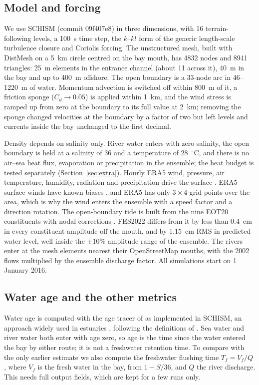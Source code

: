 \documentclass[a4paper,fleqn]{ems-dc}
\begin{document}
\subsection{Model and forcing}
We use SCHISM \citep{Zhang2008,Zhang2016} (commit 09f407e8) in three dimensions, with 16
terrain-following levels, a 100~s time step, the $k$--$kl$ form of the generic length-scale
turbulence closure \citep{Umlauf2003,Warner2005} and Coriolis forcing. The unstructured mesh, built with
DistMesh \citep{Persson2004} on a 5~km circle centred on the bay mouth, has 4832 nodes and
8941 triangles: 25~m elements in the entrance channel (about 11 across it), 40~m in the bay
and up to 400~m offshore. The open boundary is a 33-node arc in 46--1220~m of water. Momentum
advection is switched off within 800~m of it, a friction sponge ($C_d \to 0.05$) is applied
within 1~km, and the wind stress is ramped up from zero at the boundary to its full value at
2~km; removing the sponge changed velocities at the boundary by a factor of
two but left levels and currents inside the bay unchanged to the first decimal.

Density depends on salinity only. River water enters with zero salinity, the open boundary
is held at a salinity of 36 and a temperature of 28~$^\circ$C, and there is no air--sea heat flux, evaporation or
precipitation in the ensemble; the heat budget is tested separately
(Section~\ref{sec:extra}). Hourly ERA5 wind, pressure, air temperature, humidity, radiation
and precipitation drive the surface \citep{Hersbach2020}. ERA5 surface winds have known
biases \citep{BelmonteRivas2019}, and ERA5 has only $3 \times 4$ grid points over the area, which is why the wind enters the ensemble with a speed factor and a
direction rotation. The open-boundary tide is built from the nine EOT20 constituents with
nodal corrections \citep{Pugh2014}. FES2022 differs from it by less than 0.4~cm in every constituent
amplitude off the mouth, and by 1.15~cm RMS in predicted water level, well inside the
$\pm10\%$ amplitude range of the ensemble. The rivers enter at the mesh elements nearest
their OpenStreetMap mouths, with the 2002 flows multiplied by the ensemble discharge factor.
All simulations start on 1 January 2016.

\subsection{Water age and the other metrics}\label{sec:metrics}
Water age is computed with the age tracer of \citet{Deleersnijder2001} \citep[see also][]{Delhez1999} as implemented in
SCHISM, an approach widely used in estuaries \citep{Shen2004}, following the definitions of \citet{Monsen2002}. Sea water and river water both
enter with age zero, so age is the time since the water entered the bay by either route; it
is not a freshwater retention time. To compare with the only earlier estimate we also
compute the freshwater flushing time $T_f = V_f/Q$ \citep{Alber1999,Sheldon2002}, where $V_f$ is the
fresh water in the bay, from $1 - S/36$, and $Q$ the river discharge. This needs full output
fields, which are kept for a few runs only.
\end{document}
